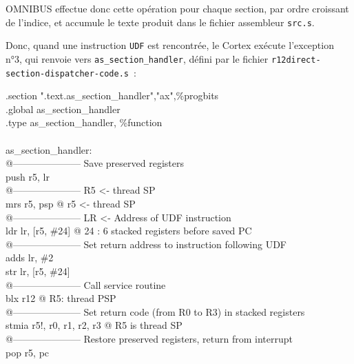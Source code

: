 OMNIBUS effectue donc cette opération pour chaque section, par ordre croissant de l'indice, et accumule le texte produit dans le fichier assembleur \texttt{src.s}.

Donc, quand une instruction \texttt{UDF} est rencontrée, le Cortex exécute l'exception n°3, qui renvoie vers \texttt{as\_section\_handler}, défini par le fichier \texttt{r12direct-section-dispatcher-code.s}~:

\begin{SHELL}\small
\hspace*{1.2em}.section	".text.as\_section\_handler","ax",\%progbits\\
\hspace*{1.2em}.global as\_section\_handler\\
\hspace*{1.2em}.type as\_section\_handler, \%function\\
\\
as\_section\_handler:\\
@--------------------- Save preserved registers\\
\hspace*{1.2em}push  {r5, lr}\\
@--------------------- R5 <- thread SP\\
\hspace*{1.2em}mrs   r5, psp           @ r5 <- thread SP\\
@--------------------- LR <- Address of UDF instruction\\
\hspace*{1.2em}ldr   lr, [r5, \#24]     @ 24 : 6 stacked registers before saved PC\\
@--------------------- Set return address to instruction following UDF\\
\hspace*{1.2em}adds  lr, \#2\\
\hspace*{1.2em}str   lr, [r5, \#24]\\
@--------------------- Call service routine\\
\hspace*{1.2em}blx   r12                      @ R5: thread PSP\\
@--------------------- Set return code (from R0 to R3) in stacked registers\\
\hspace*{1.2em}stmia r5!, {r0, r1, r2, r3}    @ R5 is thread SP\\
@--------------------- Restore preserved registers, return from interrupt\\
\hspace*{1.2em}pop   {r5, pc}
\end{SHELL}

